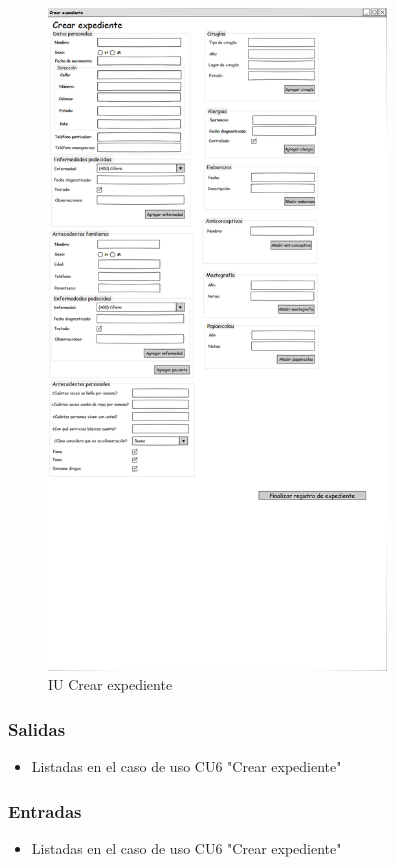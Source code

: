 \begin{figure}[htbp!]
	\centering
	\includegraphics[width=0.8\textwidth]{images/IU_crear_expediente}
	\caption{IU Crear expediente}
\end{figure}


\subsubsection{Salidas}
\begin{itemize} 
	\item Listadas en el caso de uso CU6 "Crear expediente"
\end{itemize}
\subsubsection{Entradas}
\begin{itemize}
	\item Listadas en el caso de uso CU6 "Crear expediente"
\end{itemize}

